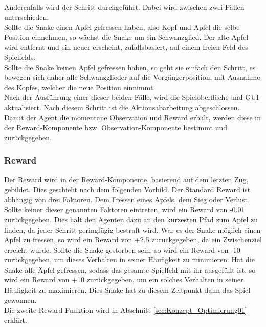 Anderenfalls wird der Schritt durchgeführt. Dabei wird zwischen zwei Fällen unterschieden.\\
Sollte die Snake einen Apfel gefressen haben, also Kopf und Apfel die selbe Position einnehmen, so wächst die Snake um ein Schwanzglied. Der alte Apfel wird entfernt und ein neuer erscheint, zufallsbasiert, auf einem freien Feld des Spielfelds.\\
Sollte die Snake keinen Apfel gefressen haben, so geht sie einfach den Schritt, es bewegen sich daher alle Schwanzglieder auf die Vorgängerposition, mit Ausnahme des Kopfes, welcher die neue Position einnimmt.\\
Nach der Ausführung einer dieser beiden Fälle, wird die Spieloberfläche und GUI aktualisiert. Nach diesem Schritt ist die Aktionsabarbeitung abgeschlossen.\\
Damit der Agent die momentane Observation und Reward erhält, werden diese in der Reward-Komponente bzw. Observation-Komponente bestimmt und zurückgegeben.

\subsubsection{Reward} \label{sec:Konzept_Reward}
Der Reward wird in der Reward-Komponente, basierend auf dem letzten Zug, gebildet. Dies geschieht nach dem folgenden Vorbild.
Der Standard Reward ist abhängig von drei Faktoren. Dem Fressen eines Apfels, dem Sieg oder Verlust. Sollte keiner dieser genannten Faktoren eintreten, wird ein Reward von -0.01 zurückgegeben. Dies hält den Agenten dazu an den kürzesten Pfad zum Apfel zu finden, da jeder Schritt geringfügig bestraft wird.
War es der Snake möglich einen Apfel zu fressen, so wird ein Reward von +2.5 zurückgegeben, da ein Zwischenziel erreicht wurde.
Sollte die Snake gestorben sein, so wird ein Reward von -10 zurückgegeben, um dieses Verhalten in seiner Häufigkeit zu minimieren.
Hat die Snake alle Äpfel gefressen, sodass das gesamte Spielfeld mit ihr ausgefüllt ist, so wird ein Reward von +10 zurückgegeben, um ein solches Verhalten in seiner Häufigkeit zu maximieren. Dies Snake hat zu diesem Zeitpunkt dann das Spiel gewonnen.\\
Die zweite Reward Funktion wird in Abschnitt \ref{sec:Konzept_Optimierung01} erklärt.

